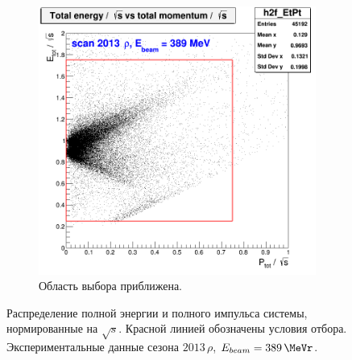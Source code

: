 \begin{figure}[htbp]
\begin{subfigure}[b]{0.45\textwidth}
        \includegraphics[width=\textwidth]{img/h2f_EtPt_zoom.png}
        \caption{Область выбора приближена.}
        \label{fig:EtPt_zoom}
    \end{subfigure}
    \caption{Распределение полной энергии и полного импульса системы,
        нормированные на $\sqrt{s}$.
        Красной линией обозначены условия отбора.
        Экспериментальные данные сезона $2013 \, \rho$,
        $E_{beam} = \SI{389}{\MeVr}$.}\label{fig:EtPt}
\end{figure}

